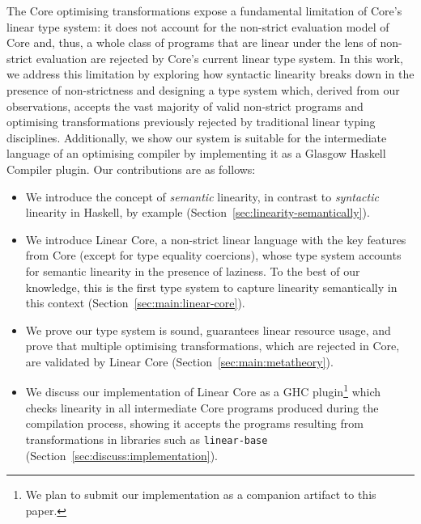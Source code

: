 \documentclass[acmsmall,review,anonymous,screen]{acmart}
\begin{document}

The Core optimising transformations expose a fundamental limitation of Core's
linear type system: it does not account for the non-strict evaluation model
of Core and, thus, a whole class of programs that are linear under the lens of
non-strict evaluation are rejected by Core's current linear type system.
%
In this work, we address this limitation by exploring how syntactic linearity
breaks down in the presence of non-strictness and designing a type system which,
derived from our observations, accepts the vast majority of valid non-strict
programs and optimising transformations previously rejected by traditional
linear typing disciplines. Additionally, we show our system
%
is suitable for the intermediate language of an
optimising compiler by implementing it as a Glasgow Haskell Compiler plugin.
%
Our contributions are as follows:
%
\begin{itemize}

\item We introduce the concept of \emph{semantic} linearity, in
contrast to \emph{syntactic} linearity in Haskell, by example
(Section~\ref{sec:linearity-semantically}).

\item We introduce Linear Core, a non-strict linear language with
the key features from Core (except for type equality coercions), whose type system
accounts for semantic linearity in the presence of laziness. To the
best of our knowledge, this is the first type system to capture linearity
semantically in this context
(Section~\ref{sec:main:linear-core}).

\item We prove our type system is sound, guarantees linear resource usage, and
    prove that multiple optimising transformations, which are rejected in Core,
        are validated by Linear Core (Section~\ref{sec:main:metatheory}).

\item We discuss our implementation of Linear Core as a GHC
  plugin\footnote{We plan to submit our implementation as a companion
    artifact to this paper.} which checks linearity in
all intermediate Core programs produced during the compilation process, showing
it accepts the programs resulting from transformations in libraries such as
\texttt{linear-base} (Section~\ref{sec:discuss:implementation}).

\end{itemize}
\end{document}
